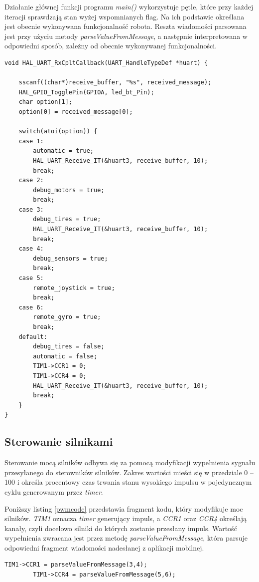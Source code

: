 Działanie głównej funkcji programu \textit{main()} wykorzystuje pętle, które przy każdej iteracji sprawdzają stan wyżej wspomnianych flag. Na ich podstawie określana jest obecnie wykonywana funkcjonalność robota. Reszta wiadomości parsowana jest przy użyciu metody \textit{parseValueFromMessage}, a następnie interpretowana w odpowiedni sposób, zależny od obecnie wykonywanej funkcjonalności.

\begin{minipage}{\textwidth}
	\begin{lstlisting}[label=interruptcode,caption=Funkcja obsługująca przerwanie.]
void HAL_UART_RxCpltCallback(UART_HandleTypeDef *huart) {

	sscanf((char*)receive_buffer, "%s", received_message);
	HAL_GPIO_TogglePin(GPIOA, led_bt_Pin);
	char option[1];
	option[0] = received_message[0];

	switch(atoi(option)) {
	case 1:
		automatic = true;
		HAL_UART_Receive_IT(&huart3, receive_buffer, 10);
		break;
	case 2:
		debug_motors = true;
		break;
	case 3:
		debug_tires = true;
		HAL_UART_Receive_IT(&huart3, receive_buffer, 10);
		break;
	case 4:
		debug_sensors = true;
		break;
	case 5:
		remote_joystick = true;
		break;
	case 6:
		remote_gyro = true;
		break;
	default:
		debug_tires = false;
		automatic = false;
		TIM1->CCR1 = 0;
		TIM1->CCR4 = 0;
		HAL_UART_Receive_IT(&huart3, receive_buffer, 10);
	    break;
	}
}
	\end{lstlisting}
\end{minipage}
 
\subsection{Sterowanie silnikami}
Sterowanie mocą silników odbywa się za pomocą modyfikacji wypełnienia sygnału przesyłanego do sterowników silników. Zakres wartości mieści się w przedziale 0 – 100 i określa procentowy czas trwania stanu wysokiego impulsu w pojedyncznym cyklu generowanym przez \textit{timer}. 

Poniższy listing \ref{pwmcode} przedstawia fragment kodu, który modyfikuje moc silników. \textit{TIM1} oznacza \textit{timer} generujący impuls, a \textit{CCR1} oraz \textit{CCR4} określają kanały, czyli docelowo silniki do których zostanie przesłany impuls.  Wartość wypełnienia zwracana jest przez metodę \textit{parseValueFromMessage}, która parsuje odpowiedni fragment wiadomości nadesłanej z aplikacji mobilnej. 

\begin{minipage}{\textwidth}
	\begin{lstlisting}[label=pwmcode,caption=Sterowanie mocą silników.]
  		TIM1->CCR1 = parseValueFromMessage(3,4);
  		TIM1->CCR4 = parseValueFromMessage(5,6);
	\end{lstlisting}
\end{minipage}

